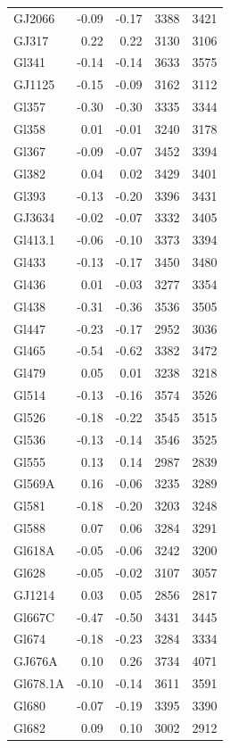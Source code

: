 \documentclass{aa}
\begin{document}
\begin{table}[]
{\begin{tabular}{ l r r r r}
GJ2066 & -0.09 & -0.17 & 3388 & 3421 \\
GJ317 & 0.22 & 0.22 & 3130 & 3106 \\
Gl341 & -0.14 & -0.14 & 3633 & 3575 \\
GJ1125 & -0.15 & -0.09 & 3162 & 3112 \\
Gl357 & -0.30 & -0.30 & 3335 & 3344 \\
Gl358 & 0.01 & -0.01 & 3240 & 3178 \\
Gl367 & -0.09 & -0.07 & 3452 & 3394 \\
Gl382 & 0.04 & 0.02 & 3429 & 3401 \\
Gl393 & -0.13 & -0.20 & 3396 & 3431 \\
GJ3634 & -0.02 & -0.07 & 3332 & 3405 \\
Gl413.1 & -0.06 & -0.10 & 3373 & 3394 \\
Gl433 & -0.13 & -0.17 & 3450 & 3480 \\
Gl436 & 0.01 & -0.03 & 3277 & 3354 \\
Gl438 & -0.31 & -0.36 & 3536 & 3505 \\
Gl447 & -0.23 & -0.17 & 2952 & 3036 \\
Gl465 & -0.54 & -0.62 & 3382 & 3472 \\
Gl479 & 0.05 & 0.01 & 3238 & 3218 \\
Gl514 & -0.13 & -0.16 & 3574 & 3526 \\
Gl526 & -0.18 & -0.22 & 3545 & 3515 \\
Gl536 & -0.13 & -0.14 & 3546 & 3525 \\
Gl555 & 0.13 & 0.14 & 2987 & 2839 \\
Gl569A & 0.16 & -0.06 & 3235 & 3289 \\
Gl581 & -0.18 & -0.20 & 3203 & 3248 \\
Gl588 & 0.07 & 0.06 & 3284 & 3291 \\
Gl618A & -0.05 & -0.06 & 3242 & 3200 \\
Gl628 & -0.05 & -0.02 & 3107 & 3057 \\
GJ1214 & 0.03 & 0.05 & 2856 & 2817 \\
Gl667C & -0.47 & -0.50 & 3431 & 3445 \\
Gl674 & -0.18 & -0.23 & 3284 & 3334 \\
GJ676A & 0.10 & 0.26 & 3734 & 4071 \\
Gl678.1A & -0.10 & -0.14 & 3611 & 3591 \\
Gl680 & -0.07 & -0.19 & 3395 & 3390 \\
Gl682 & 0.09 & 0.10 & 3002 & 2912 \\

\end{tabular}}
\end{table}
\end{document}
